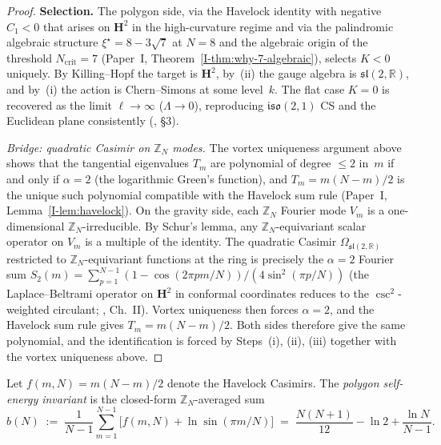 \begin{proof}
\textbf{Selection.}
The polygon side, via the Havelock identity with negative
$C_1 < 0$ that arises on $\mathbf{H}^2$ in the
high-curvature regime and via the palindromic algebraic
structure $\xi^\star = 8 - 3\sqrt{7}$ at $N = 8$
and the algebraic origin of the threshold $N_{\mathrm{crit}}
= 7$ (Paper~I, Theorem~\ref*{I-thm:why-7-algebraic}),
selects
$K < 0$ uniquely.  By Killing--Hopf the target is
$\mathbf{H}^2$, by~(ii) the gauge algebra is
$\mathfrak{sl}(2,\mathbb{R})$, and by~(i) the action is
Chern--Simons at some level~$k$.
The flat case $K = 0$ is recovered as the limit
$\ell \to \infty$ ($\Lambda \to 0$), reproducing
$\mathfrak{iso}(2,1)$ CS and the Euclidean plane
consistently (\citealt{Witten1988}, \S3).

\emph{Bridge: quadratic Casimir on $\mathbb{Z}_N$ modes.}
The vortex uniqueness argument above shows that the
tangential eigenvalues $T_m$ are polynomial of degree
$\le 2$ in~$m$ if and only if $\alpha = 2$ (the logarithmic
Green's function), and $T_m = m(N{-}m)/2$ is the unique
such polynomial compatible with the Havelock sum rule
(Paper~I, Lemma~\ref*{I-lem:havelock}).
On the gravity side, each $\mathbb{Z}_N$ Fourier mode
$V_m$ is a one-dimensional $\mathbb{Z}_N$-irreducible.
By Schur's lemma, any $\mathbb{Z}_N$-equivariant
scalar operator on $V_m$ is a multiple of the identity.
The quadratic Casimir
$\Omega_{\mathfrak{sl}(2,\mathbb{R})}$ restricted to
$\mathbb{Z}_N$-equivariant functions at the ring is
precisely the $\alpha = 2$ Fourier sum
$S_2(m) = \sum_{p=1}^{N-1}
(1 - \cos(2\pi pm/N))/(4\sin^2(\pi p/N))$
(the Laplace--Beltrami operator on $\mathbf{H}^2$ in
conformal coordinates reduces to the $\csc^2$-weighted
circulant; \citealt{Helgason1984}, Ch.~II).
Vortex uniqueness then forces $\alpha = 2$, and the
Havelock sum rule gives $T_m = m(N{-}m)/2$.
Both sides therefore give the same polynomial,
and the identification is forced by Steps~(i), (ii), (iii)
together with the vortex uniqueness above.
\end{proof}

\begin{definition}
\label{def:polygon-self-energy}
Let $f(m,N) = m(N{-}m)/2$ denote the Havelock Casimirs.
The \emph{polygon self-energy invariant} is the closed-form
$\mathbb{Z}_N$-averaged sum
\begin{equation}\label{eq:b-definition}
  b(N) \;:=\; \frac{1}{N{-}1}\sum_{m=1}^{N-1}
  \bigl[f(m,N) + \ln\sin(\pi m/N)\bigr]
  \;=\; \frac{N(N{+}1)}{12} - \ln 2
  + \frac{\ln N}{N{-}1}.
\end{equation}
\end{definition}

